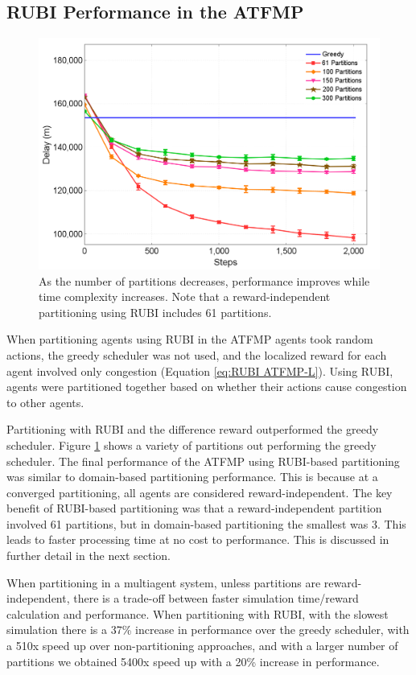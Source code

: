 \documentclass[letterpaper]{article}
\begin{document}
\subsection{RUBI Performance in the ATFMP}

\begin{figure}
\centering
\includegraphics[width=.75\columnwidth]{ATFMPNewvsGreedy}
\caption{As the number of partitions decreases, performance improves while time complexity increases. Note that a reward-independent partitioning using RUBI includes 61 partitions. }
\label{ATFMPNewvsGreedy}
\end{figure}


When partitioning agents using RUBI in the ATFMP agents took random actions, the greedy scheduler was not used, and the localized reward for each agent involved only congestion (Equation \ref{eq:RUBI ATFMP-L}). Using RUBI, agents were partitioned together based on whether their actions cause congestion to other agents. 

Partitioning with RUBI and the difference reward outperformed the greedy scheduler. Figure \ref{ATFMPNewvsGreedy} shows a variety of partitions out performing the greedy scheduler. The final performance of the ATFMP using RUBI-based partitioning was similar to domain-based partitioning performance. This is because at a converged partitioning, all agents are considered reward-independent. The key benefit of RUBI-based partitioning was that a reward-independent partition involved 61 partitions, but in domain-based partitioning the smallest was 3. This leads to faster processing time at no cost to performance. This is discussed in further detail in the next section.

When partitioning in a multiagent system, unless partitions are reward-independent, there is a trade-off between faster simulation time/reward calculation and performance. When partitioning with RUBI, with the slowest simulation there is a 37\% increase in performance over the greedy scheduler, with a 510x speed up over non-partitioning approaches, and with a larger number of partitions we obtained 5400x speed up with a 20\% increase in performance.
\end{document}
